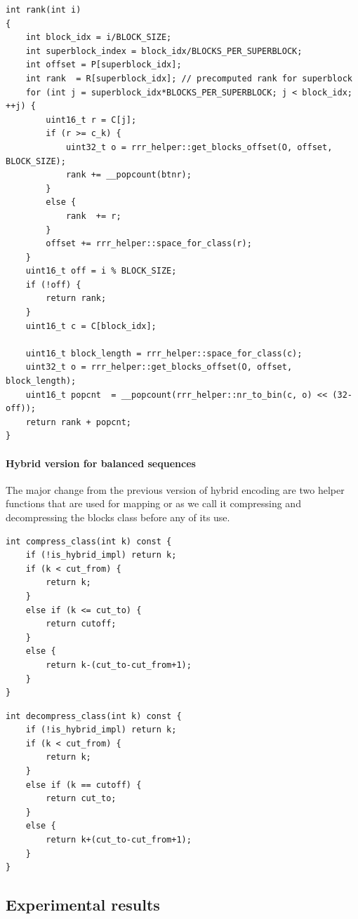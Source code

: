 \begin{lstlisting}
int rank(int i)
{
	int block_idx = i/BLOCK_SIZE;
	int superblock_index = block_idx/BLOCKS_PER_SUPERBLOCK;
	int offset = P[superblock_idx];
	int rank  = R[superblock_idx]; // precomputed rank for superblock
	for (int j = superblock_idx*BLOCKS_PER_SUPERBLOCK; j < block_idx; ++j) {
		uint16_t r = C[j];
		if (r >= c_k) {
			uint32_t o = rrr_helper::get_blocks_offset(O, offset, BLOCK_SIZE);
			rank += __popcount(btnr);
		}
		else {
			rank  += r;
		}
		offset += rrr_helper::space_for_class(r);
	}
	uint16_t off = i % BLOCK_SIZE;
	if (!off) {
		return rank;
	}
	uint16_t c = C[block_idx];

	uint16_t block_length = rrr_helper::space_for_class(c);
	uint32_t o = rrr_helper::get_blocks_offset(O, offset, block_length);
	uint16_t popcnt  = __popcount(rrr_helper::nr_to_bin(c, o) << (32-off));
	return rank + popcnt;
}
\end{lstlisting}

\paragraph{Hybrid version for balanced sequences}

The major change from the previous version of hybrid encoding are two helper
functions that are used for mapping or as we call it compressing and decompressing
the blocks class before any of its use.

\begin{lstlisting}
int compress_class(int k) const {
	if (!is_hybrid_impl) return k;
	if (k < cut_from) {
		return k;
	}
	else if (k <= cut_to) {
		return cutoff;
	}
	else {
		return k-(cut_to-cut_from+1);
	}
}
\end{lstlisting}

\begin{lstlisting}
int decompress_class(int k) const {
	if (!is_hybrid_impl) return k;
	if (k < cut_from) {
		return k;
	}
	else if (k == cutoff) {
		return cut_to;
	}
	else {
		return k+(cut_to-cut_from+1);
	}
}
\end{lstlisting}

\subsection{Experimental results}

